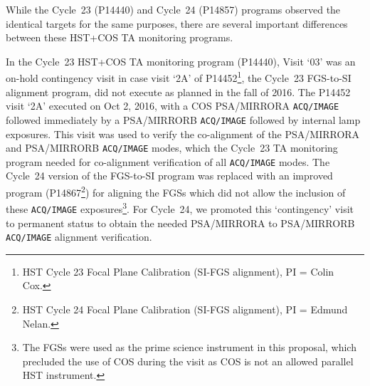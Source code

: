 \documentclass[12pt]{reportj}
\newcommand{\pid}[1]{{\rm P}#1}
\newcommand{\tacq}[1]{\texttt{ACQ/#1}}
\begin{document}
While the Cycle~23 (\pid{14440}) and Cycle~24 (\pid{14857}) programs observed the identical targets for the same purposes, there are several important differences between these HST+COS TA monitoring programs.

In the Cycle~23 HST+COS TA monitoring program (\pid{14440}), Visit `03' was an on-hold contingency visit in case visit `2A' of \pid{14452}\footnote{HST Cycle 23 Focal Plane Calibration (SI-FGS alignment), PI = Colin Cox.}, the Cycle~23 FGS-to-SI alignment program, did not execute as planned in the fall of 2016. The \pid{14452} visit `2A' executed on Oct 2, 2016, with a COS PSA/MIRRORA \tacq{IMAGE} followed immediately by a PSA/MIRRORB \tacq{IMAGE} followed by internal lamp exposures. This visit was used to verify the co-alignment of the PSA/MIRRORA and PSA/MIRRORB \tacq{IMAGE} modes, which the Cycle~23 TA monitoring program needed for co-alignment verification of all \tacq{IMAGE} modes. The Cycle~24 version of the FGS-to-SI program was replaced with an improved program (\pid{14867}\footnote{HST Cycle 24 Focal Plane Calibration (SI-FGS alignment), PI = Edmund Nelan.}) for aligning the FGSs which did not allow the inclusion of these \tacq{IMAGE} exposures\footnote{The FGSs were used as the prime science instrument in this proposal, which precluded the use of COS during the visit as COS is not an allowed parallel HST instrument.}. For Cycle~24, we promoted this `contingency' visit to permanent status to obtain the needed PSA/MIRRORA to PSA/MIRRORB \tacq{IMAGE} alignment verification.
\end{document}
